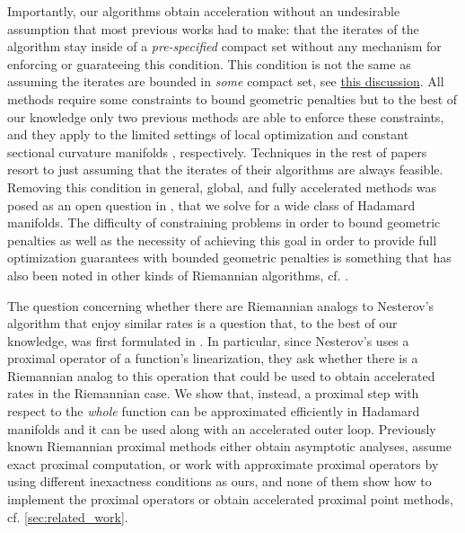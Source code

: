 \documentclass[12pt]{alt2021}
\begin{document}
Importantly, our algorithms obtain acceleration without an undesirable assumption that most previous works had to make: that the iterates of the algorithm stay inside of a \emph{pre-specified} compact set without any mechanism for enforcing or guarateeing this condition. This condition is not the same as assuming the iterates are bounded in \emph{some} compact set, see \hyperlink{sec:handling_constraints_to_bound_geometric_penalties}{this discussion}. All methods require some constraints to bound geometric penalties but to the best of our knowledge only two previous methods are able to enforce these constraints, and they apply to the limited settings of local optimization \citep{criscitiello2022negative} and constant sectional curvature manifolds \citep{martinez2021acceleration}, respectively. Techniques in the rest of papers resort to just assuming that the iterates of their algorithms are always feasible. Removing this condition in general, global, and fully accelerated methods was posed as an open question in \citep{kim2022accelerated}, that we solve for a wide class of Hadamard manifolds. The difficulty of constraining problems in order to bound geometric penalties as well as the necessity of achieving this goal in order to provide full optimization guarantees with bounded geometric penalties is something that has also been noted in other kinds of Riemannian algorithms, cf. \citep{hosseini2020recent}. 


The question concerning whether there are Riemannian analogs to Nesterov's algorithm that enjoy similar rates is a question that, to the best of our knowledge, was first formulated in \citep{zhang2016first}. In particular, since Nesterov's \AGD{} uses a proximal operator of a function's linearization, they ask whether there is a Riemannian analog to this operation that could be used to obtain accelerated rates in the Riemannian case. We show that, instead, a proximal step with respect to the \textit{whole} function can be approximated efficiently in Hadamard manifolds and it can be used along with an accelerated outer loop.
Previously known Riemannian proximal methods either obtain asymptotic analyses, assume exact proximal computation, or work with approximate proximal operators by using different inexactness conditions as ours, and none of them show how to implement the proximal operators or obtain accelerated proximal point methods, cf. \cref{sec:related_work}. 
\end{document}
